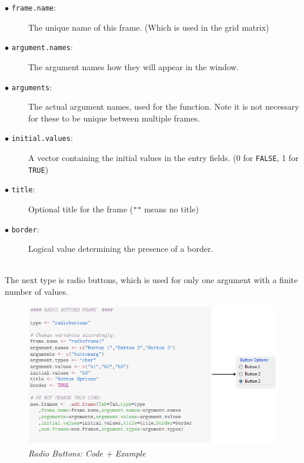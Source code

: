 \documentclass[a4paper]{article}\usepackage[]{graphicx}\usepackage[]{color}
\begin{document}
\begin{description}
  \item[$\bullet$ \texttt{frame.name}:] The unique name of this frame. (Which is used in the grid matrix)
  \item[$\bullet$ \texttt{argument.names}:] The argument names how they will
  appear in the window.
  \item[$\bullet$ \texttt{arguments}:] The actual argument names, used for the
  function. Note it is not necessary for these to be unique between multiple
  frames.
  \item[$\bullet$ \texttt{initial.values}:] A vector containing the initial
  values in the entry fields. (0 for \verb|FALSE|, 1 for \verb|TRUE|)
  \item[$\bullet$ \texttt{title}:] Optional title for the frame (\verb|""| means no title)
  \item[$\bullet$ \texttt{border}:] Logical value determining the presence of a
  border. 
\end{description}


\\
The next type is radio buttons, which is used for only one argument with a
finite number of values.
\begin{figure}[H]
\centering
\includegraphics[scale=0.5]{figures/radiobuttons.png}
\caption{{\it Radio Buttons: Code + Example}
\label{radiobuttons}}
\end{figure}
\end{document}
